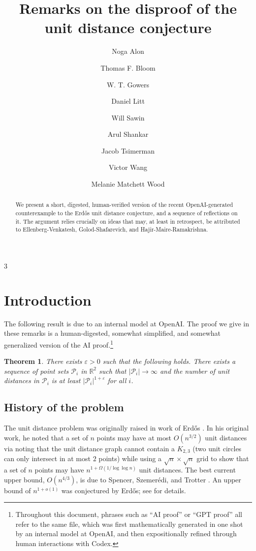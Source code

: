 \documentclass[11pt,reqno]{amsart}
\title{Remarks on the disproof of the unit distance conjecture}
\author{Noga Alon}
\author{Thomas F. Bloom}
\author{W. T. Gowers}
\author{Daniel Litt}
\author{Will Sawin}
\author{Arul Shankar}
\author{Jacob Tsimerman}
\author{Victor Wang}
\author{Melanie Matchett Wood}
\numberwithin{equation}{section}
\newtheorem{theorem}{Theorem}[section]
\theoremstyle{definition}
\theoremstyle{remark}
\newcommand{\mb}{\mathbb}
\newcommand{\eps}{\varepsilon}
\newcommand{\mc}{\mathcal}
\begin{document}
\begin{abstract}
We present a short, digested, human-verified version of the
recent OpenAI-generated counterexample to the Erd\H{o}s unit distance conjecture,
and a sequence of reflections on it.
The argument relies crucially on ideas that may,
at least in retrospect,
be attributed to
Ellenberg-Venkatesh,
Golod-Shafarevich,
and Hajir-Maire-Ramakrishna.
\end{abstract}

\maketitle

\setcounter{tocdepth}{1}
{\tiny
\begin{multicols}{3}
\tableofcontents
\end{multicols}
}
\setcounter{tocdepth}{3}

\section{Introduction}

The following result is due to an internal model at OpenAI.
The proof we give in these remarks is a human-digested, somewhat simplified, and somewhat generalized version of the AI proof.\footnote{Throughout this document,
phrases such as ``AI proof'' or ``GPT proof'' all refer to the same file,
which was first mathematically generated in one shot by an internal model at OpenAI,
and then expositionally refined through human interactions with Codex.}

\begin{theorem}\label{thm:main}
There exists $\eps>0$ such that the following holds. There exists a sequence of point sets $\mc{P}_i$ in $\mb{R}^2$ such that $|\mc{P}_i|\to \infty$ and the number of unit distances in $\mc{P}_i$ is at least $|\mc{P}_i|^{1+\eps}$ for all $i$.
\end{theorem}


\subsection{History of the problem}
The unit distance problem was originally raised in work of Erd\H{o}s \cite{Erdos1946SetsDistances}. In his original work, he noted that a set of $n$ points may have at most $O(n^{3/2})$ unit distances via noting that the unit distance graph cannot contain a $K_{2,3}$ (two unit circles can only intersect in at most $2$ points) while using a $\sqrt{n}\times \sqrt{n}$ grid to show that a set of $n$ points may have $n^{1+\Omega(1/\log\log n)}$ unit distances. 
The best current upper bound, $O(n^{4/3})$,
is due to Spencer, Szemer{\'e}di, and Trotter \cite{SpencerSzemerediTrotter1984UnitDistances}.
An upper bound of $n^{1+o(1)}$ was conjectured by Erd\H{o}s;
see \cite{BloomErdosProblem90} for details.
\end{document}
